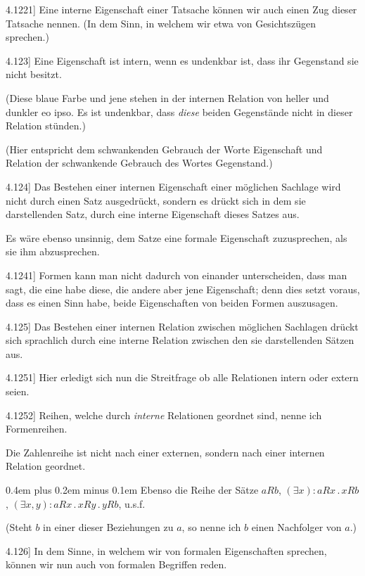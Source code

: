 \documentclass[12pt,oneside]{book}[2007/10/19]
\newcommand{\PropERef}[1]{\hyperref[PropE:#1]{#1}}
\newcommand{\PropositionG}[2]{%
  \item[\phantomsection\label{PropG:#1}\PropERef{#1}] #2%
}
\newcommand{\DotOp}{\mathbin{.}}
\newcommand{\Emph}[1]{\emph{#1}}%
\newcommand{\undSoFort}{u.\;s.\;f.}
\newcommand{\stretchyspace}{\spaceskip0.4em plus 0.2em minus 0.1em}
\begin{document}
\begin{propositions}
\PropositionG{4.1221}
{Eine interne Eigenschaft einer Tatsache können
wir auch einen Zug dieser Tatsache nennen. (In
dem Sinn, in welchem wir etwa von Gesichtszügen
sprechen.)}


\PropositionG{4.123}
{Eine Eigenschaft ist intern, wenn es undenkbar
ist, dass ihr Gegenstand sie nicht besitzt.

(Diese blaue Farbe und jene stehen in der
internen Relation von heller und dunkler eo ipso.
Es ist undenkbar, dass \Emph{diese} beiden Gegenstände
nicht in dieser Relation stünden.)

(Hier entspricht dem schwankenden Gebrauch
der Worte \glqq{}Eigenschaft\grqq{} und \glqq{}Relation\grqq{} der
schwankende Gebrauch des Wortes \glqq{}Gegenstand\grqq{}.)}


\PropositionG{4.124}
{Das Bestehen einer internen Eigenschaft einer
möglichen Sachlage wird nicht durch einen Satz
ausgedrückt, sondern es drückt sich in dem sie
darstellenden Satz, durch eine interne Eigenschaft
dieses Satzes aus.

Es wäre ebenso unsinnig, dem Satze eine
formale Eigenschaft zuzusprechen, als sie ihm
abzusprechen.}


\PropositionG{4.1241}
{Formen kann man nicht dadurch von einander
unterscheiden, dass man sagt, die eine habe diese,
die andere aber jene Eigenschaft; denn dies setzt
voraus, dass es einen Sinn habe, beide Eigenschaften
von beiden Formen auszusagen.}


\PropositionG{4.125}
{Das Bestehen einer internen Relation zwischen
möglichen Sachlagen drückt sich sprachlich durch
eine interne Relation zwischen den sie darstellenden
Sätzen aus.}


\PropositionG{4.1251}
{Hier erledigt sich nun die Streitfrage \glqq{}ob alle
Relationen intern oder extern\grqq{} seien.}


\PropositionG{4.1252}
{Reihen, welche durch \Emph{interne} Relationen
geordnet sind, nenne ich Formenreihen.

Die Zahlenreihe ist nicht nach einer externen,
sondern nach einer internen Relation geordnet.

{\stretchyspace
Ebenso die Reihe der Sätze \glqq{}$aRb$\grqq{},
\glqq{}$(\exists x): aRx \DotOp xRb$\grqq{},
\glqq{}$(\exists x,y): aRx \DotOp xRy \DotOp yRb$\grqq{}, \undSoFort}

(Steht $b$ in einer dieser Beziehungen zu $a$, so
nenne ich $b$ einen Nachfolger von $a$.)}


\PropositionG{4.126}
{In dem Sinne, in welchem wir von formalen
Eigenschaften sprechen, können wir nun auch
von formalen Begriffen reden.

}
\end{propositions}
\end{document}
